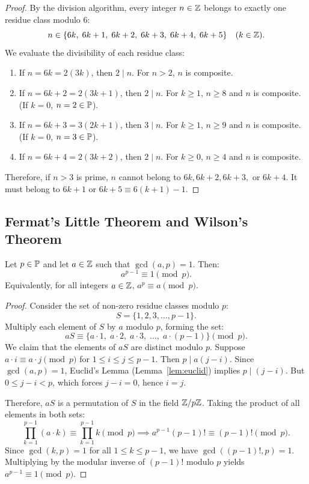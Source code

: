 \begin{proof}
\leanok
By the division algorithm, every integer $n \in \mathbb{Z}$ belongs to exactly one residue class modulo $6$:
$$n \in \{6k, \; 6k + 1, \; 6k + 2, \; 6k + 3, \; 6k + 4, \; 6k + 5\} \quad (k \in \mathbb{Z}).$$
We evaluate the divisibility of each residue class:
\begin{enumerate}
  \item If $n = 6k = 2(3k)$, then $2 \mid n$. For $n > 2$, $n$ is composite.
  \item If $n = 6k + 2 = 2(3k + 1)$, then $2 \mid n$. For $k \ge 1$, $n \ge 8$ and $n$ is composite. (If $k = 0$, $n = 2 \in \mathbb{P}$).
  \item If $n = 6k + 3 = 3(2k + 1)$, then $3 \mid n$. For $k \ge 1$, $n \ge 9$ and $n$ is composite. (If $k = 0$, $n = 3 \in \mathbb{P}$).
  \item If $n = 6k + 4 = 2(3k + 2)$, then $2 \mid n$. For $k \ge 0$, $n \ge 4$ and $n$ is composite.
\end{enumerate}
Therefore, if $n > 3$ is prime, $n$ cannot belong to $6k, 6k+2, 6k+3,$ or $6k+4$. It must belong to $6k+1$ or $6k+5 \equiv 6(k+1) - 1$.
\end{proof}

\subsection{Fermat's Little Theorem and Wilson's Theorem}

\begin{theorem}
\label{thm:flt}
\leanok
Let $p \in \mathbb{P}$ and let $a \in \mathbb{Z}$ such that $\gcd(a, p) = 1$. Then:
\begin{equation}
\label{eq:flt}
a^{p-1} \equiv 1 \pmod p.
\end{equation}
Equivalently, for all integers $a \in \mathbb{Z}$, $a^p \equiv a \pmod p$.
\end{theorem}

\begin{proof}
\leanok
Consider the set of non-zero residue classes modulo $p$:
$$S = \{1, 2, 3, \dots, p-1\}.$$
Multiply each element of $S$ by $a$ modulo $p$, forming the set:
$$a S \equiv \{a \cdot 1, \; a \cdot 2, \; a \cdot 3, \; \dots, \; a \cdot (p-1)\} \pmod p.$$
We claim that the elements of $a S$ are distinct modulo $p$. Suppose $a \cdot i \equiv a \cdot j \pmod p$ for $1 \le i \le j \le p-1$. Then $p \mid a(j - i)$. Since $\gcd(a, p) = 1$, Euclid's Lemma (Lemma~\ref{lem:euclid}) implies $p \mid (j - i)$. But $0 \le j - i < p$, which forces $j - i = 0$, hence $i = j$.

Therefore, $a S$ is a permutation of $S$ in the field $\mathbb{Z}/p\mathbb{Z}$. Taking the product of all elements in both sets:
$$\prod_{k=1}^{p-1} (a \cdot k) \equiv \prod_{k=1}^{p-1} k \pmod p \implies a^{p-1} (p-1)! \equiv (p-1)! \pmod p.$$
Since $\gcd(k, p) = 1$ for all $1 \le k \le p-1$, we have $\gcd((p-1)!, p) = 1$. Multiplying by the modular inverse of $(p-1)!$ modulo $p$ yields $a^{p-1} \equiv 1 \pmod p$.
\end{proof}

